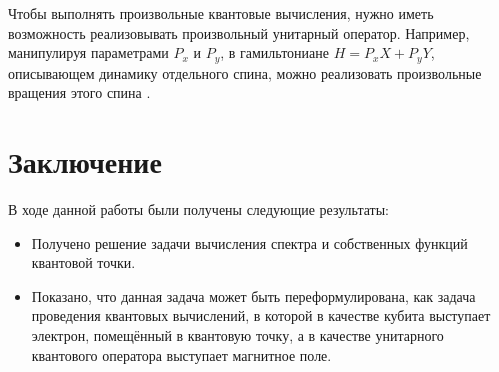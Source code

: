 \documentclass[14pt,a4paper]{PhDthesis}
\begin{document}
Чтобы выполнять произвольные квантовые вычисления, нужно иметь возможность реализовывать произвольный унитарный оператор. Например, манипулируя
параметрами $P_{x}$ и $P_{y}$, в гамильтониане $H = P_{x}X + P_{y}Y$, описывающем динамику отдельного спина, можно реализовать произвольные вращения этого спина \cite{Blum:1983ru}.

\newpage
\section{Заключение}
В ходе данной работы были получены следующие результаты:
\begin{itemize}
  \item Получено решение задачи вычисления спектра и собственных функций квантовой точки.
  \item Показано, что данная задача может быть переформулирована, как задача проведения квантовых вычислений, в которой в качестве кубита выступает электрон, помещённый в квантовую точку, а в качестве унитарного квантового оператора выступает магнитное поле.
 \end{itemize}




\newpage


\end{document}
